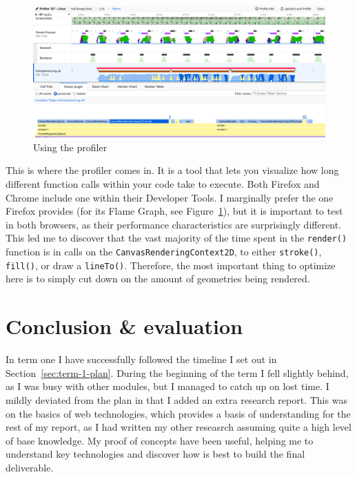\documentclass{final_report}
\begin{document}
\begin{figure}[ht]
    \centering
    \includegraphics[width=\textwidth]{../proof-of-concepts/4-rendering-osm-data/screenshots/profiling.png}
    \caption{Using the profiler}\label{fig:profiling}
\end{figure}

This is where the profiler comes in. It is a tool that lets you visualize how long different function calls within your code take to execute. Both Firefox and Chrome include one within their Developer Tools. I marginally prefer the one Firefox provides (for its Flame Graph, see Figure~\ref{fig:profiling}), but it is important to test in both browsers, as their performance characteristics are surprisingly different. This led me to discover that the vast majority of the time spent in the \texttt{render()} function is in calls on the \texttt{CanvasRenderingContext2D}, to either \texttt{stroke()}, \texttt{fill()}, or draw a \texttt{lineTo()}. Therefore, the most important thing to optimize here is to simply cut down on the amount of geometries being rendered.


\clearpage
\chapter{Conclusion \& evaluation}


In term one I have successfully followed the timeline I set out in Section~\ref{sec:term-1-plan}. During the beginning of the term I fell slightly behind, as I was busy with other modules, but I managed to catch up on lost time. I mildly deviated from the plan in that I added an extra research report. This was on the basics of web technologies, which provides a basis of understanding for the rest of my report, as I had written my other reseasrch assuming quite a high level of base knowledge. My proof of concepts have been useful, helping me to understand key technologies and discover how is best to build the final deliverable.
\end{document}
